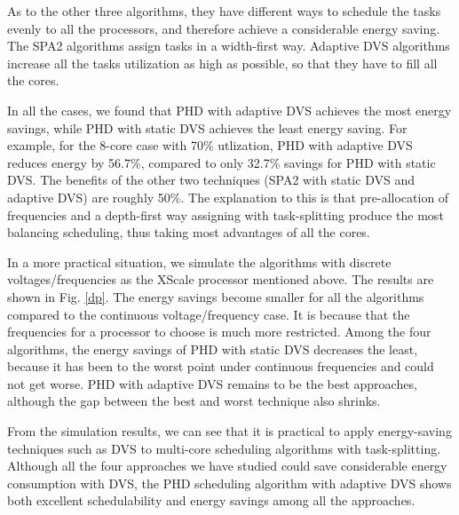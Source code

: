 \documentclass[12pt, journal,compsoc]{IEEEtran}
\begin{document}
As to the other three algorithms, they have different ways to schedule the tasks evenly to all the processors, and therefore achieve a considerable energy saving. The SPA2 algorithms assign tasks in a width-first way. Adaptive DVS algorithms increase all the tasks utilization as high as possible, so that they have to fill all the cores.

In all the cases, we found that PHD with adaptive DVS achieves the most energy savings, while PHD with static DVS achieves the least energy saving. For example, for the 8-core case with 70\% utlization, PHD with adaptive DVS reduces energy by 56.7\%, compared to only 32.7\% savings for PHD with static DVS. The benefits of the other two techniques (SPA2 with static DVS and adaptive DVS) are roughly 50\%.
The explanation to this is that pre-allocation of frequencies and a depth-first way assigning with task-splitting produce the most balancing scheduling, thus taking most advantages of all the cores.

In a more practical situation, we simulate the algorithms with discrete voltages/frequencies as the XScale processor mentioned above. The results are shown in Fig. \ref{dp}. The energy savings become smaller for all the algorithms compared to the continuous voltage/frequency case. It is because that the frequencies for a processor to choose is much more restricted. Among the four algorithms, the energy savings of PHD with static DVS decreases the least, because it has been to the worst point under continuous frequencies and could not get worse. PHD with adaptive DVS remains to be the best approaches, although the gap between the best and worst technique also shrinks.


\vspace{0.1in}

From the simulation results, we can see that it is practical to apply energy-saving techniques such as DVS to multi-core scheduling algorithms with task-splitting. Although all the four approaches we have studied could save considerable energy consumption with DVS, the PHD scheduling algorithm with adaptive DVS shows both excellent schedulability and energy savings among all the approaches.
\end{document}
